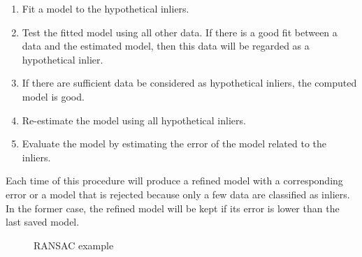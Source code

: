 \begin{enumerate}
    \item Fit a model to the hypothetical inliers.
    \item Test the fitted model using all other data. If there is a good fit between a data and the estimated model, then this data will be regarded as a hypothetical inlier.
    \item If there are sufficient data be considered as hypothetical inliers, the computed model is good.
    \item Re-estimate the model using all hypothetical inliers.
    \item Evaluate the model by estimating the error of the model related to the inliers.
\end{enumerate}

Each time of this procedure will produce a refined model with a corresponding error or a model that is rejected because only a few data are classified as inliers. In the former case, the refined model will be kept if its error is lower than the last saved model.

\begin{figure}[H]
\centering
{}
\caption{RANSAC example \citep{random}}
\label{ransac}
\end{figure}

